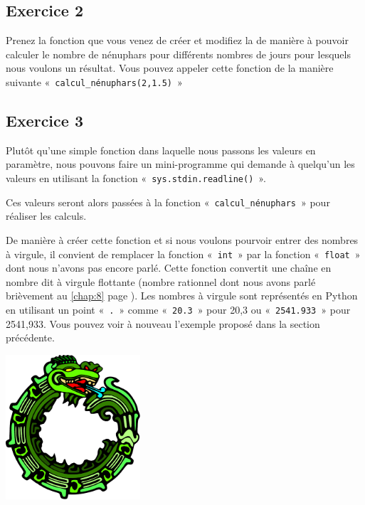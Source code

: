 \subsection{Exercice 2}
Prenez la fonction que vous venez de créer et modifiez la de manière à pouvoir calculer le nombre de nénuphars pour différents nombres de jours pour lesquels nous voulons un résultat.
Vous pouvez appeler cette fonction de la manière suivante «~\texttt{calcul\_nénuphars(2,1.5)}~» 

\subsection{Exercice 3}
Plutôt qu'une simple fonction dans laquelle nous passons les valeurs en paramètre, nous pouvons faire un mini-programme qui demande à quelqu'un les valeurs en utilisant la fonction «~\texttt{sys.stdin.readline()}~».

Ces valeurs seront alors passées à la fonction «~\texttt{calcul\_nénuphars}~» pour réaliser les calculs.

De manière à créer cette fonction et si nous voulons pourvoir entrer des nombres à virgule, il convient de remplacer la fonction «~\texttt{int}~» par la fonction «~\texttt{float}~» dont nous n'avons pas encore parlé.
Cette fonction convertit une chaîne en nombre dit à virgule flottante (nombre rationnel dont nous avons parlé brièvement au \autoref{chap:8} page \pageref{chap:8}). Les nombres à virgule sont représentés en Python en utilisant un point «~\texttt{.}~» comme «~\texttt{20.3}~» pour 20,3 ou «~\texttt{2541.933}~»  pour 2541,933. Vous pouvez voir à nouveau l'exemple  proposé dans la section précédente.


 \vfill
\begin{center}
 \includegraphics[width=5cm]{images/ourochin.pdf}
\end{center}
 \vfill